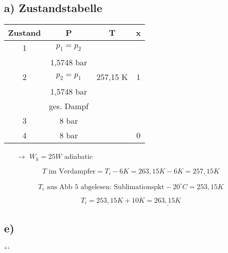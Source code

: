 \subsection*{a) Zustandstabelle}

\begin{tabular}{|c|c|c|c|}
\hline
Zustand & P & T & x \\
\hline
1 & $p_1 = p_2$ & & \\
  & 1,5748 bar & & \\
\hline
2 & $p_2 = p_1$ & 257,15 K & 1 \\
  & 1,5748 bar & & \\
  & ges. Dampf & & \\
\hline
3 & 8 bar & & \\
\hline
4 & 8 bar & & 0 \\
\hline
\end{tabular}

\begin{itemize}
    \item[$\rightarrow$] $W_k = 25W$ adiabatic
\end{itemize}

\[
T \text{ im Verdampfer} = T_i - 6K = 263,15K - 6K = \underline{257,15K}
\]

\[
T_i \text{ aus Abb 5 abgelesen: Sublimationspkt} -20^\circ C = 253,15K
\]

\[
T_i = 253,15K + 10K = \underline{263,15K}
\]



\subsection*{e)}
```